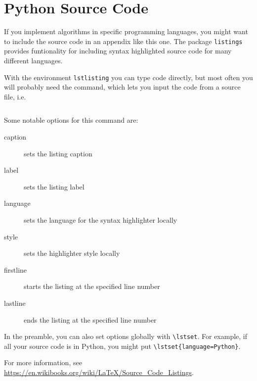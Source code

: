 
\chapter{Python Source Code}
\label{app:code}

If you implement algorithms in specific programming languages, you might want to include the source code in an appendix like this one.
The package \texttt{listings} provides funtionality for including syntax highlighted source code for many different languages.

With the environment \texttt{lstlisting} you can type code directly, but most often you will probably need the \verb!! command, which lets you input the code from a source file, i.e.
%
\begin{verbatim}

\end{verbatim}
%
Some notable options for this command are:
%
\begin{description}
\item[caption] sets the listing caption
\item[label] sets the listing label
\item[language] sets the language for the syntax highlighter locally
\item[style] sets the highlighter style locally
\item[firstline] starts the listing at the specified line number
\item[lastline] ends the listing at the specified line number
\end{description}
%
In the preamble, you can also set options globally with \verb!\lstset!.
For example, if all your source code is in Python, you might put \verb!\lstset{language=Python}!.



For more information, see \url{https://en.wikibooks.org/wiki/LaTeX/Source_Code_Listings}.